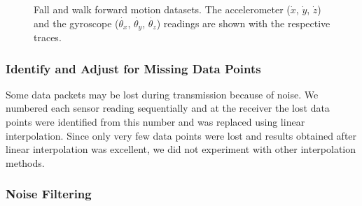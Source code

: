 \documentclass[]{IEEEtran}
\begin{document}
\begin{figure}[!tbh]
\centering
  \mbox{}
  \mbox{}
  \caption{Fall and walk forward motion datasets. The accelerometer ($\dot{x}$, 
  $\dot{y}$, $\dot{z}$) and the gyroscope ($\dot{\theta_x}$, 
  $\dot{\theta_y}$, $\dot{\theta_z}$) readings are shown with the respective traces. }
\end{figure}


\subsubsection{Identify and Adjust for Missing Data Points}
\label{sec:IdentifyAndAdjustForMissingDataPoints} Some data packets may be lost
during transmission because of noise. We numbered each sensor reading
sequentially and at the receiver the lost data points were identified from this
number and was replaced using linear interpolation. Since only very few data
points were lost and results obtained after linear interpolation was excellent,
we did not experiment with other interpolation methods.


\subsubsection{Noise Filtering}
\label{sec:NoiseFiltering}
\end{document}
